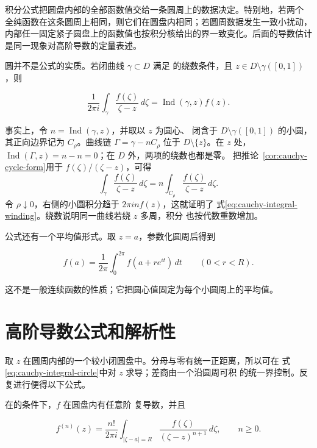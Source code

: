 积分公式把圆盘内部的全部函数值交给一条圆周上的数据决定。特别地，若两个
全纯函数在这条圆周上相同，则它们在圆盘内相同；若圆周数据发生一致小扰动，
内部任一固定紧子圆盘上的函数值也按积分核给出的界一致变化。后面的导数估计
是同一现象对高阶导数的定量表述。

圆并不是公式的实质。若闭曲线 \(\gamma\subset D\) 满足
的绕数条件，且
\(z\in D\setminus\gamma([0,1])\)，则

\begin{equation}
 \frac1{2\pi i}\int_\gamma\frac{f(\zeta)}{\zeta-z}\,d\zeta
 =\operatorname{Ind}(\gamma,z)f(z).
 \label{eq:cauchy-integral-winding}
\end{equation}

事实上，令 \(n=\operatorname{Ind}(\gamma,z)\)，并取以 \(z\) 为圆心、
闭含于 \(D\setminus\gamma([0,1])\) 的小圆，其正向边界记为 \(C_\rho\)。曲线链
\(\Gamma=\gamma-nC_\rho\) 位于 \(D\setminus\{z\}\)。在 \(z\) 处，
\(\operatorname{Ind}(\Gamma,z)=n-n=0\)；在 \(D\) 外，两项的绕数也都是零。
把推论~\ref{cor:cauchy-cycle-form}用于
\(f(\zeta)/(\zeta-z)\)，可得
\[
 \int_\gamma\frac{f(\zeta)}{\zeta-z}\,d\zeta
 =n\int_{C_\rho}\frac{f(\zeta)}{\zeta-z}\,d\zeta.
\]
令 \(\rho\downarrow0\)，右侧的小圆积分趋于 \(2\pi i n f(z)\)，这就证明了
式\eqref{eq:cauchy-integral-winding}。绕数说明同一曲线若绕 \(z\) 多周，积分
也按代数重数增加。

公式还有一个平均值形式。取 \(z=a\)，参数化圆周后得到

\begin{equation}
 f(a)=\frac1{2\pi}\int_0^{2\pi}f(a+re^{it})\,dt
 \qquad(0<r<R).
 \label{eq:holomorphic-circle-mean}
\end{equation}

这不是一般连续函数的性质；它把圆心值固定为每个小圆周上的平均值。

\section{高阶导数公式和解析性}

取 \(z\) 在圆周内部的一个较小闭圆盘中。分母与零有统一正距离，所以可在
式\eqref{eq:cauchy-integral-circle}中对 \(z\) 求导；差商由一个沿圆周可积
的统一界控制。反复进行便得以下公式。

\begin{theorem}
\label{thm:cauchy-derivative-formula}
在的条件下，\(f\) 在圆盘内有任意阶
复导数，并且

\begin{equation}
 f^{(n)}(z)=\frac{n!}{2\pi i}
 \int_{|\zeta-a|=R}\frac{f(\zeta)}{(\zeta-z)^{n+1}}\,d\zeta,
 \qquad n\ge0.
 \label{eq:cauchy-derivative-formula}
\end{equation}
\end{theorem}

